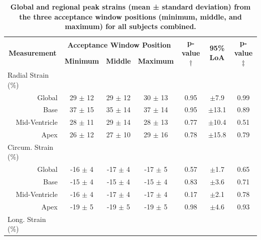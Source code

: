 	\begin{table}
		\centering
		\caption[Global and regional peak strains (mean ± standard deviation) from the three acceptance window positions (minimum, middle, and maximum) for all subjects combined]{\textbf{Global and regional peak strains (mean ± standard deviation) from the three acceptance window positions (minimum, middle, and maximum) for all subjects combined.}}
		\label{table:strainDifferencesPosition}
		\begin{tabular}{c c c c c c c}
			\toprule
			\multirow{2}{*}{\textbf{Measurement}} & \multicolumn{3}{c}{\textbf{Acceptance Window Position}} & \multirow{2}{*}{\textbf{p-value$\dagger$}} & \multirow{2}{*}{\textbf{95\% LoA}}    & \multirow{2}{*}{\textbf{p-value$\ddagger$}} \\ 
			                                      & \textbf{Minimum} & \textbf{Middle} & \textbf{Maximum} & & &    \\
			\midrule
			\multicolumn{1}{l}{Radial Strain (\%)} & & & & & &       								              \\
			\multicolumn{1}{r}{Global}  	  & 29 $\pm$ 12 & 29 $\pm$ 12 & 30 $\pm$ 13 & 0.95 & $\pm$7.9  & 0.99 \\
			\multicolumn{1}{r}{Base}  		  & 37 $\pm$ 15 & 35 $\pm$ 14 & 37 $\pm$ 14 & 0.95 & $\pm$13.1 & 0.89 \\
			\multicolumn{1}{r}{Mid-Ventricle} & 28 $\pm$ 11 & 29 $\pm$ 14 & 28 $\pm$ 13 & 0.77 & $\pm$10.4 & 0.51 \\
			\multicolumn{1}{r}{Apex}  		  & 26 $\pm$ 12 & 27 $\pm$ 10 & 29 $\pm$ 16 & 0.78 & $\pm$15.8 & 0.79 \\
			\multicolumn{1}{l}{Circum. Strain (\%)} & & & & & &								                      \\
			\multicolumn{1}{r}{Global}  	  & -16 $\pm$ 4 & -17 $\pm$ 4 & -17 $\pm$ 5 & 0.57 & $\pm$1.7  & 0.65 \\
			\multicolumn{1}{r}{Base}  		  & -15 $\pm$ 4	& -15 $\pm$ 4 & -15 $\pm$ 4 & 0.83 & $\pm$3.6  & 0.71 \\
			\multicolumn{1}{r}{Mid-Ventricle} & -16 $\pm$ 4 & -17 $\pm$ 4 & -17 $\pm$ 4 & 0.17 & $\pm$2.1  & 0.78 \\	   			\multicolumn{1}{r}{Apex}          & -19 $\pm$ 5 & -19 $\pm$ 5 & -19 $\pm$ 5 & 0.98 & $\pm$4.6  & 0.93 \\
			\multicolumn{1}{l}{Long. Strain (\%)} & & & & & &								    				  \\

\end{tabular}
\end{table}
